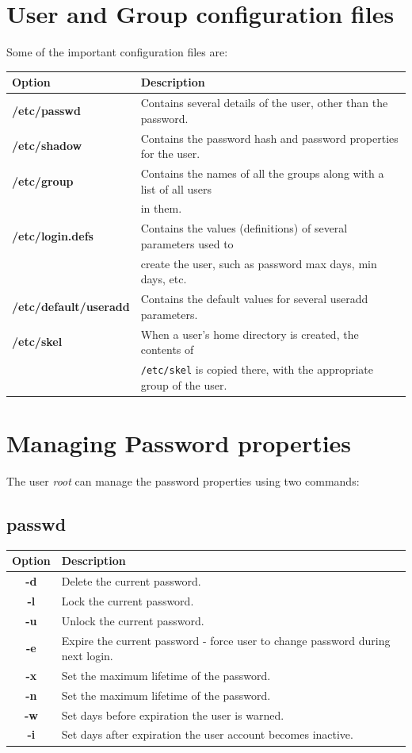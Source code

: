 \documentclass{report}
\begin{document}
	\section{User and Group configuration files}
	Some of the important configuration files are:
	
	\noindent
	\begin{tabular}{ll}
		\toprule
		\textbf{Option} &\textbf{Description} \\
		\midrule
		\textbf{/etc/passwd} &Contains several details of the user, other than the password.  \\
		\textbf{/etc/shadow} &Contains the password hash and password properties for the user. \\
		\textbf{/etc/group} &Contains the names of all the groups along with a list of all users \\&in them. \\
		\textbf{/etc/login.defs} &Contains the values (definitions) of several parameters used to \\&create the user, such as password max days, min days, etc.\\
		\textbf{/etc/default/useradd} &Contains the default values for several useradd parameters. \\
		\textbf{/etc/skel} &When a user's home directory is created, the contents of \\&\verb|/etc/skel| is copied there, with the appropriate group of the user.\\
		\bottomrule
	\end{tabular}

	\section{Managing Password properties}
	The user \textit{root} can manage the password properties using two commands:
	
	\subsection{passwd}
	\begin{tabular}{cl}
		\toprule
		\textbf{Option} &\textbf{Description} \\
		\midrule
		\textbf{-d} &Delete the current password. \\
		\textbf{-l} &Lock the current password. \\
		\textbf{-u} &Unlock the current password. \\
		\textbf{-e} &Expire the current password - force user to change password during next login. \\
		\textbf{-x} &Set the maximum lifetime of the password. \\
		\textbf{-n} &Set the maximum lifetime of the password. \\
		\textbf{-w} &Set days before expiration the user is warned. \\ 
		\textbf{-i} &Set days after expiration the user account becomes inactive. \\
		\bottomrule
	\end{tabular}
\end{document}
